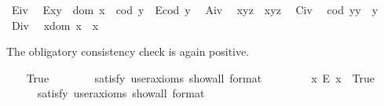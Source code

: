 \begin{isabellebody}
\ E\isactrlsub i\isactrlsub v{\isacharcolon}\ %
\ {\isachardoublequoteopen}E{\isacharparenleft}x{\isasymcdot}y{\isacharparenright}\ \isactrlbold {\isasymleftrightarrow}\ {\isacharparenleft}dom\ x\ {\isasymcong}\ cod\ y\ \isactrlbold {\isasymand}\ E{\isacharparenleft}cod\ y{\isacharparenright}{\isacharparenright}{\isachardoublequoteclose}\ \isanewline
\ A\isactrlsub i\isactrlsub v{\isacharcolon}\ %
\ {\isachardoublequoteopen}x{\isasymcdot}{\isacharparenleft}y{\isasymcdot}z{\isacharparenright}\ {\isasymcong}\ {\isacharparenleft}x{\isasymcdot}y{\isacharparenright}{\isasymcdot}z{\isachardoublequoteclose}\ \isanewline
\ C\isactrlsub i\isactrlsub v{\isacharcolon}\ %
\ {\isachardoublequoteopen}{\isacharparenleft}cod\ y{\isacharparenright}{\isasymcdot}y\ {\isasymcong}\ y{\isachardoublequoteclose}\ \isanewline
\ D\isactrlsub i\isactrlsub v{\isacharcolon}\ %
\ {\isachardoublequoteopen}x{\isasymcdot}{\isacharparenleft}dom\ x{\isacharparenright}\ {\isasymcong}\ x{\isachardoublequoteclose}%
\begin{isamarkuptext}%
The obligatory consistency check is again positive.%
\end{isamarkuptext}\isamarkuptrue%
\ \ \isamarkupfalse%
\ True\ \ %
\isanewline
\ \ \ \ \isamarkupfalse%
\ {\isacharbrackleft}satisfy{\isacharcomma}\ user{\isacharunderscore}axioms{\isacharcomma}\ show{\isacharunderscore}all{\isacharcomma}\ format\ {\isacharequal}\ {}{\isacharbrackright}%
\isadelimproof
\ %
\endisadelimproof
%
\isatagproof
{}\isamarkupfalse%
%
\endisatagproof
{\isafoldproof}%
%
\isadelimproof
%
\endisadelimproof
\isanewline
\ \ \isamarkupfalse%
\ \ {\isachardoublequoteopen}{\isasymexists}x{\isachardot}\ \isactrlbold {\isasymnot}{\isacharparenleft}E\ x{\isacharparenright}{\isachardoublequoteclose}\ \ True\ \ %
\ \ \isanewline
\ \ \ \ \isamarkupfalse%
\ {\isacharbrackleft}satisfy{\isacharcomma}\ user{\isacharunderscore}axioms{\isacharcomma}\ show{\isacharunderscore}all{\isacharcomma}\ format\ {\isacharequal}\ {}{\isacharbrackright}%
\isadelimproof
\ %
\endisadelimproof
%
\isatagproof
{}\isamarkupfalse%
%
\endisatagproof
{\isafoldproof}%
%
\isadelimproof

\end{isabellebody}
